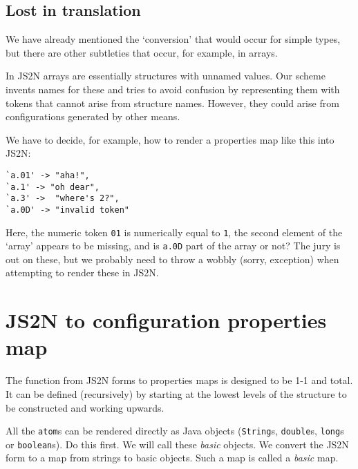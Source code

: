 \documentclass[a4paper,twoside,12pt]{article}
\begin{document}
\subsection{Lost in translation}
We have already mentioned the `conversion' that would occur for simple types, but there are other subtleties that occur, for example, in arrays.

In JS2N arrays are essentially structures with unnamed values. Our scheme invents names for these and tries to avoid confusion by representing them with tokens that cannot arise from structure names. However, they could arise from configurations generated by other means. 

We have to decide, for example, how to render a properties map like this into JS2N:
\begin{verbatim}
`a.01' -> "aha!",
`a.1' -> "oh dear",
`a.3' ->  "where's 2?",
`a.0D' -> "invalid token"
\end{verbatim}
Here, the numeric token \texttt{01} is numerically equal to \texttt{1}, the second element of the `array' appears to be missing, and is \texttt{a.0D} part of the array or not? The jury is out on these, but we probably need to throw a wobbly (sorry, exception) when attempting to render these in JS2N.

\section{JS2N to configuration properties map}
The function from JS2N forms to properties maps is designed to be 1-1 and total. It can be defined (recursively) by starting at the lowest levels of the structure to be constructed and working upwards.

All the \texttt{atom}s can be rendered directly as Java objects (\texttt{String}s, \texttt{double}s, \texttt{long}s or \texttt{boolean}s). Do this first. We will call these \emph{basic} objects. We convert the JS2N form to a map from strings to basic objects. Such a map is called a \emph{basic} map.
\end{document}

